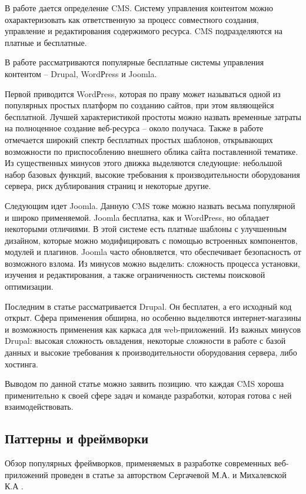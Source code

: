 В работе дается определение CMS.
Систему управления контентом можно охарактеризовать как ответственную за процесс совместного создания, управление и редактирования содержимого ресурса.
CMS подразделяются на платные и бесплатные.

В работе рассматриваются популярные бесплатные системы управления контентом -- Drupal, WordРress и Joomla.

Первой приводится WordРress, которая по праву может называться одной из популярных простых платформ по созданию сайтов, при этом являющейся бесплатной.
Лучшей характеристикой простоты можно назвать временные затраты на полноценное создание веб-ресурса -- около получаса.
Также в работе отмечается широкий спектр бесплатных простых шаблонов, открывающих возможности по приспособлению внешнего облика сайта поставленной тематике.
Из существенных минусов этого движка выделяются следующие: небольшой набор базовых функций, высокие требования к производительности оборудования сервера, риск дублирования страниц и некоторые другие.

Следующим идет Joomla.
Данную CMS тоже можно назвать весьма популярной и широко применяемой.
Joomla бесплатна, как и WordРress, но обладает некоторыми отличиями.
В этой системе есть платные шаблоны с улучшенным дизайном, которые можно модифицировать с помощью встроенных компонентов, модулей и плагинов.
Joomla часто обновляется, что обеспечивает безопасность от возможного взлома.
Из минусов можно выделить: сложность процесса установки, изучения и редактирования, а также ограниченность системы поисковой оптимизации.

Последним в статье рассматривается Drupal.
Он бесплатен, а его исходный код открыт.
Сфера применения обширна, но особенно выделяются интернет-магазины и возможность применения как каркаса для web-приложений.
Из важных минусов Drupal: высокая сложность овладения, некоторые сложности в работе с базой данных и высокие требования к производительности оборудования сервера, либо хостинга.

Выводом по данной статье можно заявить позицию. что каждая CMS хороша применительно к своей сфере задач и команде разработки, которая готова с ней взаимодействовать.


\subsection{Паттерны и фреймворки}

Обзор популярных фреймворков, применяемых в разработке современных веб-приложений проведен в статье за авторством Сергачевой М.А. и Михалевской К.А \cite{sergacheva-framework}.

